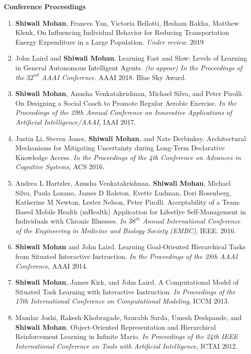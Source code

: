 \documentclass[margin,line,11pt]{res}
\begin{document}
\begin{resume}
\textbf{Conference Proceedings}
\begin{enumerate}[label=\lbrack C\arabic*\rbrack,leftmargin=*]
  \item \textbf{Shiwali Mohan}, Frances Yan, Victoria Bellotti, Hesham Rakha, Matthew Klenk, On Influencing Individual Behavior for Reducing Transportation Energy Expenditure in a Large Population. \emph{Under review}. 2019
  \item John Laird and \textbf{Shiwali Mohan}. Learning Fast and Slow: Levels of Learning in General Autonomous Intelligent Agents. \emph{(to appear) In the Proceedings of the $32^{nd}$ AAAI Conference}. AAAI 2018. Blue Sky Award.
  \item \textbf{Shiwali Mohan}, Anusha Venkatakrishnan, Michael Silva, and Peter Pirolli. On Designing a Social Coach to Promote Regular Aerobic Exercise. \emph{In the Proceedings of the 29th Annual Conference on Innovative Applications of Artificial Intelligence/AAAI}, IAAI 2017.
  \item Justin Li, Steven Jones, \textbf{Shiwali Mohan}, and Nate Derbinksy. Architectural Mechanisms for Mitigating Uncertainty during Long-Term Declarative Knowledge Access. \emph{In the Proceedings of the 4th Conference on Advances in Cognitive Systems}, ACS 2016.
  \item Andrea L Hartzler, Anusha Venkatakrishnan, \textbf{Shiwali Mohan}, Michael Silva, Paula Lozano, James D Ralston, Evette Ludman, Dori Rosenberg, Katherine M Newton, Lester Nelson, Peter Pirolli. Acceptability of a Team-Based Mobile Health (mHealth) Application for Lifestlye Self-Management in Individuals with Chronic Illnesses. \emph{In $38^{th}$ Annual International Conference of the Engineering in Medicine and Biology Society (EMBC)}, IEEE. 2016.
  \item \textbf{Shiwali Mohan} and John Laird. Learning Goal-Oriented Hierarchical Tasks from Situated Interactive Instruction. \emph{In the Proceedings of the 28th AAAI Conference}, AAAI 2014.
  \item \textbf{Shiwali Mohan}, James Kirk, and John Laird. A Computational Model of Situated Task Learning with Interactive Instruction. \emph{In Proceedings of the 17th International Conference on Computational Modeling}, ICCM 2013.
  \item Mandar Joshi, Rakesh Khobragade, Saurabh Sarda, Umesh Deshpande, and \textbf{Shiwali Mohan}. Object-Oriented Representation and Hierarchical Reinforcement Learning in Infinite Mario. \emph{In Proceedings of the 24th IEEE International Conference on Tools with Artificial Intelligence}, ICTAI 2012.

\end{enumerate}
\end{resume}
\end{document}
